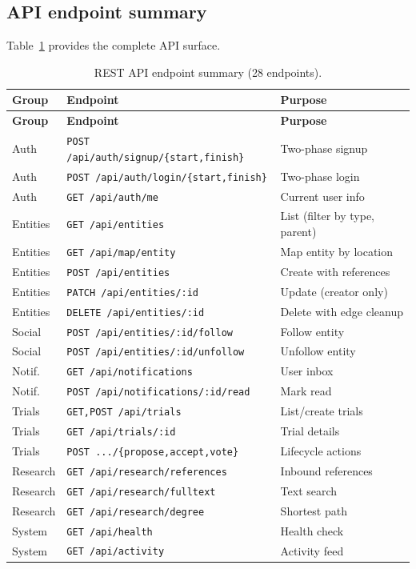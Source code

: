 \documentclass[13pt,a4paper]{report}
\begin{document}
\subsection{API endpoint summary}
Table~\ref{tab:api-endpoints} provides the complete API surface.

{\small
\begin{longtable}{l l p{5.5cm}}
\caption{REST API endpoint summary (28 endpoints).}
\label{tab:api-endpoints} \\
\toprule
\textbf{Group} & \textbf{Endpoint} & \textbf{Purpose} \\
\midrule
\endfirsthead
\toprule
\textbf{Group} & \textbf{Endpoint} & \textbf{Purpose} \\
\midrule
\endhead
Auth & \texttt{POST /api/auth/signup/\{start,finish\}} & Two-phase signup \\
Auth & \texttt{POST /api/auth/login/\{start,finish\}} & Two-phase login \\
Auth & \texttt{GET /api/auth/me} & Current user info \\
\midrule
Entities & \texttt{GET /api/entities} & List (filter by type, parent) \\
Entities & \texttt{GET /api/map/entity} & Map entity by location \\
Entities & \texttt{POST /api/entities} & Create with references \\
Entities & \texttt{PATCH /api/entities/:id} & Update (creator only) \\
Entities & \texttt{DELETE /api/entities/:id} & Delete with edge cleanup \\
\midrule
Social & \texttt{POST /api/entities/:id/follow} & Follow entity \\
Social & \texttt{POST /api/entities/:id/unfollow} & Unfollow entity \\
\midrule
Notif. & \texttt{GET /api/notifications} & User inbox \\
Notif. & \texttt{POST /api/notifications/:id/read} & Mark read \\
\midrule
Trials & \texttt{GET,POST /api/trials} & List/create trials \\
Trials & \texttt{GET /api/trials/:id} & Trial details \\
Trials & \texttt{POST .../\{propose,accept,vote\}} & Lifecycle actions \\
\midrule
Research & \texttt{GET /api/research/references} & Inbound references \\
Research & \texttt{GET /api/research/fulltext} & Text search \\
Research & \texttt{GET /api/research/degree} & Shortest path \\
\midrule
System & \texttt{GET /api/health} & Health check \\
System & \texttt{GET /api/activity} & Activity feed \\
\bottomrule
\end{longtable}
}
\end{document}
